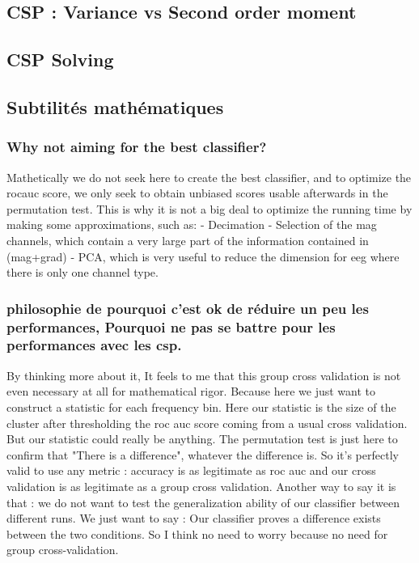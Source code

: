 \subsection{CSP : Variance vs Second order moment}

\subsection{CSP Solving}


\subsection{Subtilités mathématiques}

\subsubsection{Why not aiming for the best classifier?}
Mathetically we do not seek here to create the best classifier,
and to optimize the rocauc score, we only seek
to obtain unbiased scores usable afterwards in the permutation test.
This is why it is not a big deal to optimize the running time
by making some approximations, such as:
- Decimation
- Selection of the mag channels, which contain a very large part of
the information contained in (mag+grad)
- PCA, which is very useful to reduce the dimension for eeg
where there is only one channel type.


\subsubsection{philosophie de pourquoi c'est ok de réduire un peu les performances, Pourquoi ne pas se battre pour les performances avec les csp.}

By thinking more about it, It feels to me that this group cross validation is not even necessary at all for mathematical rigor. Because here we just want to construct a statistic for each frequency bin. Here our statistic is the size of the cluster after thresholding the roc auc score coming from a usual cross validation. But our statistic could really be anything. The permutation test is just here to confirm that "There is a difference", whatever the difference is. So it's perfectly valid to use any metric : accuracy is as legitimate as roc auc and our cross validation is as legitimate as a group cross validation.
Another way to say it is that : we do not want to test the generalization ability of our classifier between different runs. We just want to say : Our classifier proves a difference exists between the two conditions.
So I think no need to worry because no need for group cross-validation.


